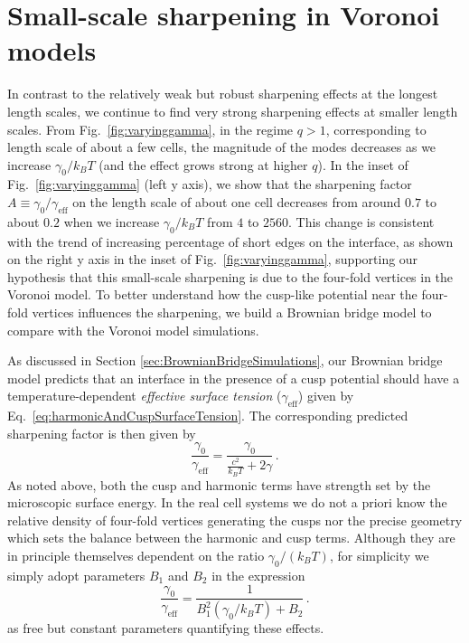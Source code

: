 \documentclass[twoside,twocolumn,9pt]{article}
\begin{document}
\section{Small-scale sharpening in Voronoi models}
In contrast to the relatively weak but robust sharpening effects at the longest length scales, we continue to find very strong sharpening effects at smaller length scales. From Fig.~\ref{fig:varyinggamma}, in the regime $q>1$, corresponding to length scale of about a few cells, the magnitude of the modes decreases as we increase $\gamma_0/k_B T$ (and the effect grows strong at higher $q$). In the inset of Fig.~\ref{fig:varyinggamma} (left y axis), we show that the sharpening factor $A\equiv\gamma_0/\gamma_{\text{eff}}$ on the length scale of about one cell decreases from around $0.7$ to about $0.2$ when we increase $\gamma_0/k_BT$ from $4$ to $2560$. This change is consistent with the trend of increasing percentage of short edges on the interface, as shown on the right y axis in the inset of Fig.~\ref{fig:varyinggamma}, supporting our hypothesis that this small-scale sharpening is due to the four-fold vertices in the Voronoi model. To better understand how the cusp-like potential near the four-fold vertices influences the sharpening, we build a Brownian bridge model to compare with the Voronoi model simulations.

As discussed in Section \ref{sec:BrownianBridgeSimulations}, our Brownian bridge model predicts that an interface in the presence of a cusp potential should have a temperature-dependent \textit{effective surface tension} ($\gamma_{\text{eff}}$) given by Eq.~\ref{eq:harmonicAndCuspSurfaceTension}. The corresponding predicted sharpening factor is then given by
\begin{equation}
    \label{eq:brownianBridgeSharpeningFactor}
    \frac{\gamma_{0}}{\gamma_{\text{eff}}} = \frac{\gamma_{0}}{\frac{c^{2}}{{k}_{B}T}+2\gamma}\,.
\end{equation}
As noted above, both the cusp and harmonic terms have strength set by the microscopic surface energy. In the real cell systems we do not a priori know the relative density of four-fold vertices generating the cusps nor the precise geometry which sets the balance between the harmonic and cusp terms. Although they are in principle themselves dependent on the ratio $\gamma_0/(k_BT)$, for simplicity we simply adopt parameters $B_{1}$ and $B_{2}$ in the expression
\begin{equation}\label{eq:brownianBridgeSharpeningFactorReduced}
    \frac{\gamma_{0}}{\gamma_{\text{eff}}} = \frac{1}{B_{1}^{2}(\gamma_{0}/{k}_{B}T)+B_{2}}\,.
\end{equation}
as free but constant parameters quantifying these effects. 
\end{document}
